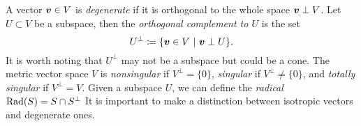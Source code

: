 A vector $\boldsymbol{v}\in V$ is \emph{degenerate} if it is orthogonal to the whole space $\boldsymbol{v}\perp V$. Let $U\subset V$ be a subspace, then the \emph{orthogonal complement to $U$} is the set 
\begin{equation}
U^\perp \coloneqq \{\boldsymbol{v} \in V ~\vert~ \boldsymbol{v}\perp U\}.
\end{equation}
It is worth noting that $U^\perp$ may not be a subspace but could be a cone. The metric vector space $V$ is \emph{nonsingular} if $V^\perp=\{0\}$, \emph{singular} if $V^\perp \neq \{0\}$, and \emph{totally singular} if $V^\perp = V$. Given a subspace $U$, we can define the \emph{radical} $\operatorname{Rad}(S)=S\cap S^\perp$  It is important to make a distinction between isotropic vectors and degenerate ones. 

